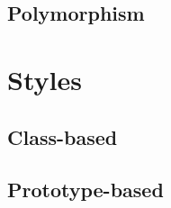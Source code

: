 \documentclass[12pt]{book}
\begin{document}
\subsection{Polymorphism}


\section{Styles}

\subsection{Class-based}

\subsection{Prototype-based}

\ifx\wholebook\relax\else
% 
% 
	
\end{document}

